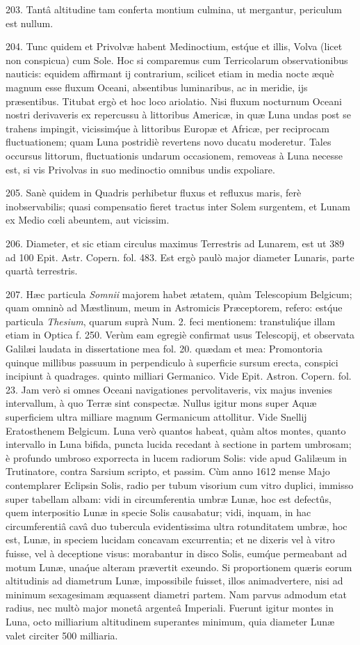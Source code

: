 \documentclass[a4paper, 11pt, oneside, polutonikogreek, german]{article}
\begin{document}
203. Tantâ altitudine tam conferta montium culmina, ut mergantur, periculum est nullum.

204. Tunc quidem et Privolvæ habent Medinoctium, est\'que et illis, Volva (licet non conspicua) cum Sole. Hoc si comparemus cum Terricolarum observationibus nauticis: equidem affirmant ij contrarium, scilicet etiam in media nocte æquè magnum esse fluxum Oceani, absentibus luminaribus, ac in meridie, ijs præsentibus. Titubat ergò et hoc loco ariolatio. Nisi fluxum nocturnum Oceani nostri derivaveris ex repercussu à littoribus Americæ, in quæ Luna undas post se trahens impingit, vicissim\'que à littoribus Europæ et Africæ, per reciprocam fluctuationem; quam Luna postridiè revertens novo ducatu moderetur. Tales occursus littorum, fluctuationis undarum occasionem, removeas à Luna necesse est, si vis Privolvas in suo medinoctio omnibus undis expoliare.

205. Sanè quidem in Quadris perhibetur fluxus et refluxus maris, ferè inobservabilis; quasi compensatio fieret tractus inter Solem surgentem, et Lunam ex Medio cœli abeuntem, aut vicissim.

206. Diameter, et sic etiam circulus maximus Terrestris ad Lunarem, est ut 389 ad 100 Epit. Astr. Copern. fol. 483. Est ergò paulò major diameter Lunaris, parte quartà terrestris.

207. Hæc particula \emph{Somnii} majorem habet ætatem, quàm Telescopium Belgicum; quam omninò ad Mæstlinum, meum in Astromicis Præceptorem, refero: est\'que particula \emph{Thesium}, quarum suprà Num. 2. feci mentionem: transtuli\'que illam etiam in Optica f. 250. Verùm eam egregiè confirmat usus Telescopij, et observata Galilæi laudata in dissertatione mea fol. 20. quædam et mea: Promontoria quinque millibus passuum in perpendiculo à superficie sursum erecta, conspici incipiunt à quadrages. quinto milliari Germanico. Vide Epit. Astron. Copern. fol. 23. Jam verò si omnes Oceani navigationes pervolitaveris, vix majus invenies intervallum, à quo Terræ sint conspectæ. Nullus igitur mons super Aquæ superficiem ultra milliare magnum Germanicum attollitur. Vide Snellij Eratosthenem Belgicum. Luna verò quantos habeat, quàm altos montes, quanto intervallo in Luna bifida, puncta lucida recedant à sectione in partem umbrosam; è profundo umbroso exporrecta in lucem radiorum Solis: vide apud Galilæum in Trutinatore, contra Sarsium scripto, et passim. Cùm anno 1612 mense Majo contemplarer Eclipsin Solis, radio per tubum visorium cum vitro duplici, immisso super tabellam albam: vidi in circumferentia umbræ Lunæ, hoc est defectûs, quem interpositio Lunæ in specie Solis causabatur; vidi, inquam, in hac circumferentiâ cavâ duo tubercula evidentissima ultra rotunditatem umbræ, hoc est, Lunæ, in speciem lucidam concavam excurrentia; et ne dixeris vel à vitro fuisse, vel à deceptione visus: morabantur in disco Solis, eum\'que permeabant ad motum Lunæ, una\'que alteram prævertit exeundo. Si proportionem quæris eorum altitudinis ad diametrum Lunæ, impossibile fuisset, illos animadvertere, nisi ad minimum sexagesimam æquassent diametri partem. Nam parvus admodum etat radius, nec multò major monetâ argenteâ Imperiali. Fuerunt igitur montes in Luna, octo milliarium altitudinem superantes minimum, quia diameter Lunæ valet circiter 500 milliaria.
\end{document}
